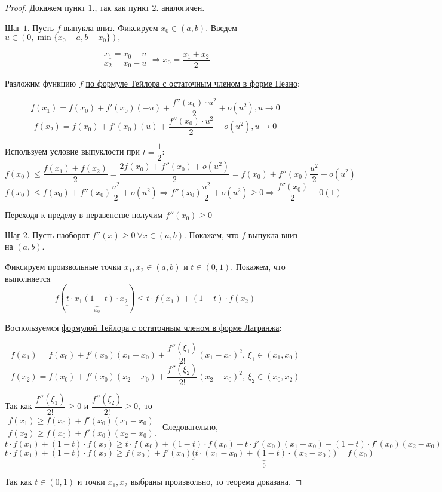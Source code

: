 \begin{proof}
	Докажем пункт $1.$, так как пункт $2.$ аналогичен.
	
	$\underline{\textrm{Шаг 1.}}$ Пусть $f$ выпукла вниз. Фиксируем $x_{0} \in (a, b)$. Введем $u \in (0,\min\{x_{0} - a, b-x_{0}\}),$
	
	$$\begin{gathered}
		x_{1} = x_{0} - u \\
		x_{2} = x_{0} - u
	\end{gathered} \Rightarrow x_{0} = \dfrac{x_{1} + x_{2}}{2}$$ 
	
	Разложим функцию $f$ \hyperlink{thrm5.14}{по формуле Тейлора с остаточным членом в форме Пеано}:
	
	$$f(x_{1}) = f(x_{0}) + f'(x_{0})(-u) + \dfrac{f''(x_{0})\cdot u^{2}}{2} + o(u^{2}), u\to0$$
	$$f(x_{2}) = f(x_{0}) + f'(x_{0})(u) + \dfrac{f''(x_{0})\cdot u^{2}}{2} + o(u^{2}), u\to0$$
	
	Используем условие выпуклости при $t = \dfrac{1}{2}$:
	$$f(x_{0}) \leq \dfrac{f(x_{1}) + f(x_{2})}{2} = \dfrac{2f(x_{0}) + f''(x_{0}) + o(u^{2})}{2} = f(x_{0}) + f''(x_{0})\dfrac{u^{2}}{2} + o(u^{2})$$
	$$f(x_{0}) \leq f(x_{0}) + f''(x_{0})\dfrac{u^{2}}{2} + o(u^{2}) \Rightarrow f''(x_{0})\dfrac{u^{2}}{2} + o(u^{2}) \geq 0 \Rightarrow \dfrac{f''(x_{0})}{2} + 0(1)$$
	
	\hyperlink{thrm4.8}{Переходя к пределу в неравенстве} получим $f''(x_{0}) \geq 0$
	
	$\underline{\textrm{Шаг 2.}}$ Пусть наоборот $f''(x) \geq 0 \ \forall x\in (a, b)$. Покажем, что $f$ выпукла вниз на $(a, b).$
	
	Фиксируем произвольные точки $x_{1}, x_{2} \in (a, b)$ и $t \in (0, 1).$ Покажем, что выполняется $$f(\underbrace{t\cdot x_{1} (1-t) \cdot x_{2}}_{x_{0}}) \leq t\cdot f(x_{1}) + (1-t) \cdot f(x_{2})$$
	
	Воспользуемся \hyperlink{thrm5.15}{формулой Тейлора с остаточным членом в форме Лагранжа}:
	
	$$f(x_{1}) = f(x_{0}) + f'(x_{0})(x_{1}-x_{0}) + \dfrac{f''(\xi_{1})}{2!} (x_{1}-x_{0})^{2}, \ \xi_{1} \in (x_{1}, x_{0}) $$
	$$f(x_{2}) = f(x_{0}) + f'(x_{0})(x_{2}-x_{0}) + \dfrac{f''(\xi_{2})}{2!} (x_{2}-x_{0})^{2}, \ \xi_{2} \in (x_{0}, x_{2}) $$
	
	Так как $\dfrac{f''(\xi_{1})}{2!}  \geq 0$ и $\dfrac{f''(\xi_{2})}{2!} \geq 0,$ то $\begin{gathered}
		f(x_{1}) \geq f(x_{0}) + f'(x_{0}) (x_{1}-x_{0}) \\
		f(x_{2}) \geq f(x_{0}) + f'(x_{0}) (x_{2}-x_{0}). 
	\end{gathered}$  Следовательно,
	$$t\cdot f(x_{1}) + (1-t) \cdot f(x_{2}) \geq t \cdot f(x_{0}) +(1-t) \cdot f(x_{0}) + t\cdot f'(x_{0})(x_{1}-x_{0}) + (1-t) \cdot f'(x_{0})(x_{2} - x_{0}) $$
	$$t\cdot f(x_{1}) + (1-t) \cdot f(x_{2}) \geq f(x_{0}) + f'(x_{0}) \underbrace{\Big(t\cdot (x_{1} - x_{0}) + (1-t)\cdot (x_{2}-x_{0})\Big)}_{0} = f(x_{0})$$
	
	Так как $t \in (0, 1)$ и точки $x_{1}, x_{2}$  выбраны произвольно, то теорема доказана.
\end{proof}

